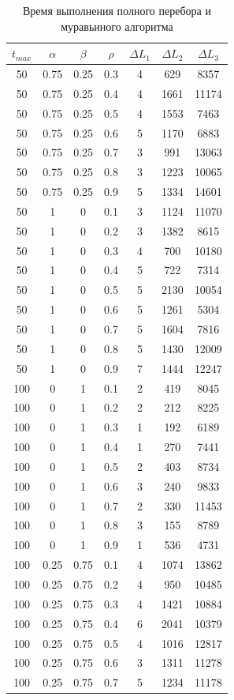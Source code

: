 \documentclass[a4paper,oneside,14pt]{extreport}
\begin{document}
\begin{table}[H]
\begin{center}
	\caption[]{\label{tbl:only} Время выполнения полного перебора и муравьиного алгоритма}
	\begin{tabular}{|c|c|c|c|c|c|c|}
		\hline
		$t_{max}$ & $\alpha$ & $\beta$ & $\rho$ & $\Delta L_{1}$ & $\Delta L_{2}$ & $\Delta L_{3}$\\
		\hline
		50 & 0.75 & 0.25 & 0.3 & 4 & 629 & 8357 \\
		50 & 0.75 & 0.25 & 0.4 & 4 & 1661 & 11174 \\
		50 & 0.75 & 0.25 & 0.5 & 4 & 1553 & 7463 \\
		50 & 0.75 & 0.25 & 0.6 & 5 & 1170 & 6883 \\
		50 & 0.75 & 0.25 & 0.7 & 3 & 991 & 13063 \\
		50 & 0.75 & 0.25 & 0.8 & 3 & 1223 & 10065 \\
		50 & 0.75 & 0.25 & 0.9 & 5 & 1334 & 14601 \\
		50 & 1 & 0 & 0.1 & 3 & 1124 & 11070 \\
		50 & 1 & 0 & 0.2 & 3 & 1382 & 8615 \\
		50 & 1 & 0 & 0.3 & 4 & 700 & 10180 \\
		50 & 1 & 0 & 0.4 & 5 & 722 & 7314 \\
		50 & 1 & 0 & 0.5 & 5 & 2130 & 10054 \\
		50 & 1 & 0 & 0.6 & 5 & 1261 & 5304 \\
		50 & 1 & 0 & 0.7 & 5 & 1604 & 7816 \\
		50 & 1 & 0 & 0.8 & 5 & 1430 & 12009 \\
		50 & 1 & 0 & 0.9 & 7 & 1444 & 12247 \\
		100 & 0 & 1 & 0.1 & 2 & 419 & 8045 \\
		100 & 0 & 1 & 0.2 & 2 & 212 & 8225 \\
		100 & 0 & 1 & 0.3 & 1 & 192 & 6189 \\
		100 & 0 & 1 & 0.4 & 1 & 270 & 7441 \\
		100 & 0 & 1 & 0.5 & 2 & 403 & 8734 \\
		100 & 0 & 1 & 0.6 & 3 & 240 & 9833 \\
		100 & 0 & 1 & 0.7 & 2 & 330 & 11453 \\
		100 & 0 & 1 & 0.8 & 3 & 155 & 8789 \\
		100 & 0 & 1 & 0.9 & 1 & 536 & 4731 \\
		100 & 0.25 & 0.75 & 0.1 & 4 & 1074 & 13862 \\
		100 & 0.25 & 0.75 & 0.2 & 4 & 950 & 10485 \\
		100 & 0.25 & 0.75 & 0.3 & 4 & 1421 & 10884 \\
		100 & 0.25 & 0.75 & 0.4 & 6 & 2041 & 10379 \\
		100 & 0.25 & 0.75 & 0.5 & 4 & 1016 & 12817 \\
		100 & 0.25 & 0.75 & 0.6 & 3 & 1311 & 11278 \\
		100 & 0.25 & 0.75 & 0.7 & 5 & 1234 & 11178 \\
		\hline
		
	\end{tabular}
\end{center}
\end{table}
\end{document}
